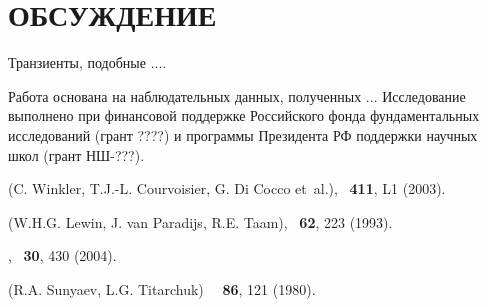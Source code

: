 \documentclass[12pt]{article}
\def\etal{{et~al.}}
\begin{document}
\section*{ОБСУЖДЕНИЕ}
\noindent
Транзиенты, подобные ....
 


Работа основана на наблюдательных данных, полученных ...
Исследование выполнено при финансовой поддержке Российского
фонда фундаментальных исследований (грант ????) и программы
Президента РФ поддержки научных школ (грант НШ-???).
 
\pagebreak   
 
\begin{references}

 (C. Winkler, T.J.-L. Courvoisier, G. Di Cocco 
\etal), \aap\ {\bf 411}, L1 (2003). 

 (W.H.G. Lewin, J. van Paradijs, R.E. Taam),
\ssr\ {\bf 62}, 223 (1993).

, \pazh\
{\bf 30}, 430 (2004). 

 (R.A. Sunyaev, L.G. Titarchuk) \dd\ \aap\ 
{\bf 86}, 121 (1980).

\end{references}
\end{document}
